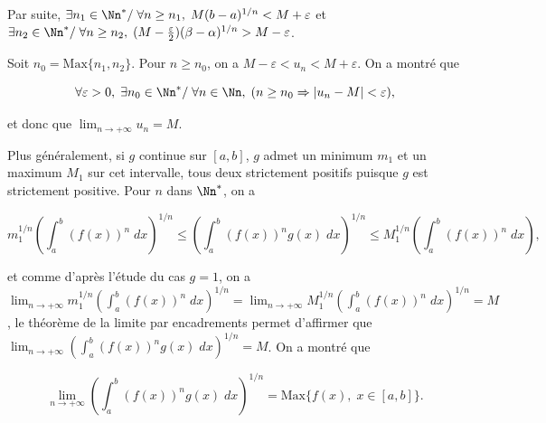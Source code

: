 {{Par suite, $\exists n_1\in\Nn^*/\;\forall n\geq n_1,\;M(b-a)^{1/n}<M+\varepsilon$ et $\exists n_2\in\Nn^*/\;\forall n\geq n_2,\;(M-\frac{\varepsilon}{2})(\beta-\alpha)^{1/n}>M-\varepsilon$.

Soit $n_0=\mbox{Max}\{n_1,n_2\}$. Pour $n\geq n_0$, on a $M-\varepsilon<u_n<M+\varepsilon$. On a montré que 

$$\forall\varepsilon>0,\;\exists n_0\in\Nn^*/\;\forall n\in\Nn,\;(n\geq n_0\Rightarrow|u_n-M|<\varepsilon),$$

et donc que $\lim_{n\rightarrow +\infty}u_n=M$.

Plus généralement, si $g$ continue sur $[a,b]$, $g$ admet un minimum $m_1$ et un maximum $M_1$ sur cet intervalle, tous deux strictement positifs puisque $g$ est strictement positive. Pour $n$ dans $\Nn^*$, on a
 
$$m_1^{1/n}\left(\int_{a}^{b}(f(x))^n\;dx\right)^{1/n}\leq\left(\int_{a}^{b}(f(x))^ng(x)\;dx\right)^{1/n}\leq M_1^{1/n}\left(\int_{a}^{b}(f(x))^n\;dx\right),$$

et comme d'après l'étude du cas $g=1$, on a $\lim_{n\rightarrow +\infty}m_1^{1/n}\left(\int_{a}^{b}(f(x))^n\;dx\right)^{1/n}=\lim_{n\rightarrow +\infty}M_1^{1/n}\left(\int_{a}^{b}(f(x))^n\;dx\right)^{1/n}=M$, le théorème de la limite par encadrements permet d'affirmer que $\lim_{n\rightarrow +\infty}\left(\int_{a}^{b}(f(x))^ng(x)\;dx\right)^{1/n}=M$. On a montré que 

$$\lim_{n\rightarrow +\infty}\left(\int_{a}^{b}(f(x))^ng(x)\;dx\right)^{1/n}=\mbox{Max}\{f(x),\;x\in[a,b]\}.$$
}
}
